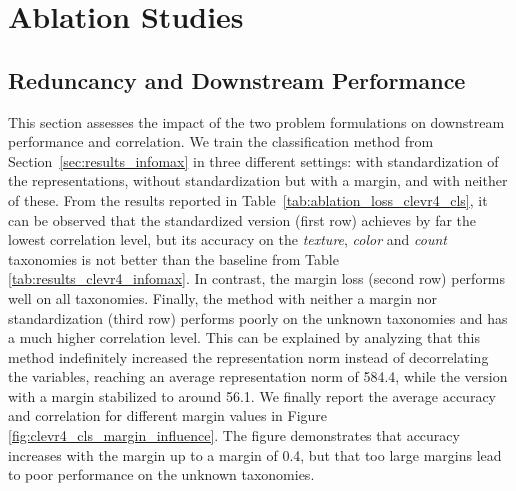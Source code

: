 \section{Ablation Studies}

\subsection{Reduncancy and Downstream Performance} \label{subapp:redundancy_analysis}

This section assesses the impact of the two problem formulations on downstream performance and correlation. 
We train the classification method from Section~\ref{sec:results_infomax} in three different settings: with standardization of the representations, without standardization but with a margin, and with neither of these. 
From the results reported in Table~\ref{tab:ablation_loss_clevr4_cls}, it can be observed that the standardized version (first row) achieves by far the lowest correlation level, but its accuracy on the \textit{texture}, \textit{color} and \textit{count} taxonomies is not better than the baseline from Table \ref{tab:results_clevr4_infomax}. 
In contrast, the margin loss (second row) performs well on all taxonomies. 
Finally, the method with neither a margin nor standardization (third row) performs poorly on the unknown taxonomies and has a much higher correlation level. This can be explained by analyzing that this method indefinitely increased the representation norm instead of decorrelating the variables, reaching an average representation norm of 584.4, while the version with a margin stabilized to around 56.1. We finally report the average accuracy and correlation for different margin values in Figure \ref{fig:clevr4_cls_margin_influence}. The figure demonstrates that accuracy increases with the margin up to a margin of 0.4, but that too large margins lead to poor performance on the unknown taxonomies. 

